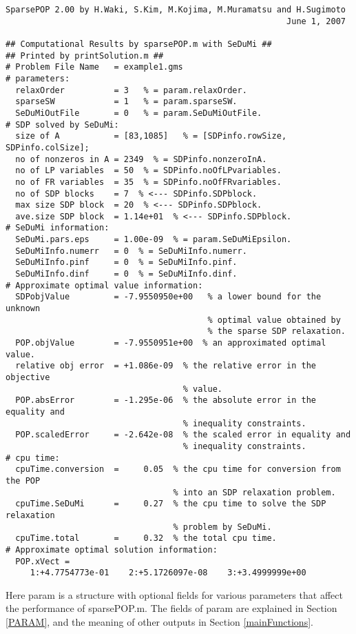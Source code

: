 \begin{verbatim}
SparsePOP 2.00 by H.Waki, S.Kim, M.Kojima, M.Muramatsu and H.Sugimoto
                                                         June 1, 2007

## Computational Results by sparsePOP.m with SeDuMi ##
## Printed by printSolution.m ##
# Problem File Name   = example1.gms
# parameters:
  relaxOrder          = 3   % = param.relaxOrder. 
  sparseSW            = 1   % = param.sparseSW.  
  SeDuMiOutFile       = 0   % = param.SeDuMiOutFile. 
# SDP solved by SeDuMi:
  size of A           = [83,1085]   % = [SDPinfo.rowSize, SDPinfo.colSize]; 
  no of nonzeros in A = 2349  % = SDPinfo.nonzeroInA. 
  no of LP variables  = 50  % = SDPinfo.noOfLPvariables.
  no of FR variables  = 35  % = SDPinfo.noOfFRvariables.
  no of SDP blocks    = 7  % <--- SDPinfo.SDPblock.
  max size SDP block  = 20  % <--- SDPinfo.SDPblock.
  ave.size SDP block  = 1.14e+01  % <--- SDPinfo.SDPblock.
# SeDuMi information:
  SeDuMi.pars.eps     = 1.00e-09  % = param.SeDuMiEpsilon. 
  SeDuMiInfo.numerr   = 0  % = SeDuMiInfo.numerr. 
  SeDuMiInfo.pinf     = 0  % = SeDuMiInfo.pinf. 
  SeDuMiInfo.dinf     = 0  % = SeDuMiInfo.dinf. 
# Approximate optimal value information:
  SDPobjValue         = -7.9550950e+00   % a lower bound for the unknown 
                                         % optimal value obtained by 
                                         % the sparse SDP relaxation. 
  POP.objValue        = -7.9550951e+00  % an approximated optimal value.
  relative obj error  = +1.086e-09  % the relative error in the objective 
                                    % value. 
  POP.absError        = -1.295e-06  % the absolute error in the equality and 
                                    % inequality constraints. 
  POP.scaledError     = -2.642e-08  % the scaled error in equality and 
                                    % inequality constraints. 
# cpu time:
  cpuTime.conversion  =     0.05  % the cpu time for conversion from the POP 
                                  % into an SDP relaxation problem.
  cpuTime.SeDuMi      =     0.27  % the cpu time to solve the SDP relaxation 
                                  % problem by SeDuMi. 
  cpuTime.total       =     0.32  % the total cpu time. 
# Approximate optimal solution information:
  POP.xVect = 
     1:+4.7754773e-01    2:+5.1726097e-08    3:+3.4999999e+00 
\end{verbatim}
Here {\sf param} is a structure with optional fields for 
various parameters 
  that affect  the performance  of sparsePOP.m. 
The fields of {\sf param} are explained in Section \ref{PARAM}, and 
the meaning of other 
outputs in Section \ref{mainFunctions}. 

